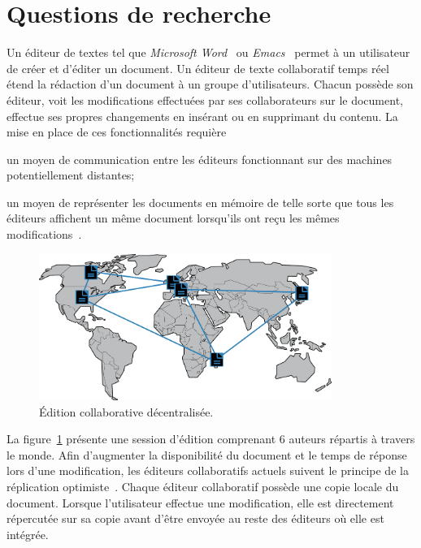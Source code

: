 
\section{Questions de recherche}

Un éditeur de textes tel que \emph{Microsoft Word}~\cite{word} ou
\emph{Emacs}~\cite{emacs} permet à un utilisateur de créer et d'éditer un
document. Un éditeur de texte collaboratif temps réel~\cite{ellis1991groupware}
étend la rédaction d'un document à un groupe d'utilisateurs. Chacun possède son
éditeur, voit les modifications effectuées par ses collaborateurs sur le
document, effectue ses propres changements en insérant ou en supprimant du
contenu. La mise en place de ces fonctionnalités requière
\begin{inparaenum}[(i)]
\item un moyen de communication entre les éditeurs fonctionnant sur des machines
  potentiellement distantes;
\item un moyen de représenter les documents en mémoire de telle sorte que tous
  les éditeurs affichent un même document lorsqu'ils ont reçu les mêmes
  modifications~\cite{burckhardt2014replicated, shapiro2011conflict}.
\end{inparaenum}

\begin{figure}
  \begin{center}
    \includegraphics[width=0.85\textwidth]{img/world.png}
    \caption[Édition collaborative décentralisée]{\label{intro:img:world}Édition
      collaborative décentralisée.}
  \end{center}
\end{figure}

La figure~\ref{intro:img:world} présente une session d'édition comprenant 6
auteurs répartis à travers le monde. Afin d'augmenter la disponibilité du
document et le temps de réponse lors d'une modification, les éditeurs
collaboratifs actuels suivent le principe de la réplication
optimiste~\cite{saito2005optimistic}. Chaque éditeur collaboratif possède une
copie locale du document.  Lorsque l'utilisateur effectue une modification, elle
est directement répercutée sur sa copie avant d'être envoyée au reste des
éditeurs où elle est intégrée.

